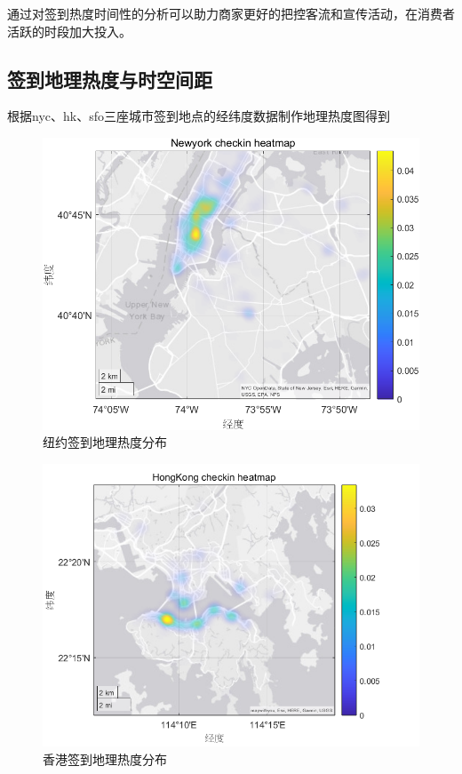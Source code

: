 \documentclass[UTF8]{ctexart}
\begin{document}
		通过对签到热度时间性的分析可以助力商家更好的把控客流和宣传活动，在消费者活跃的时段加大投入。
		
		\subsection{签到地理热度与时空间距}
		根据nyc、hk、sfo三座城市签到地点的经纬度数据制作地理热度图得到
		
		\begin{figure}[H]
			\centering
			\includegraphics[scale=0.6]{geodense_nyc.png}
			\caption{纽约签到地理热度分布}
			\label{geo_n}
		\end{figure}
		\begin{figure}[H]
			\centering
			\includegraphics[scale=0.5]{geodense_hk.png}
			\caption{香港签到地理热度分布}
			\label{geo_h}
		\end{figure}
\end{document}
